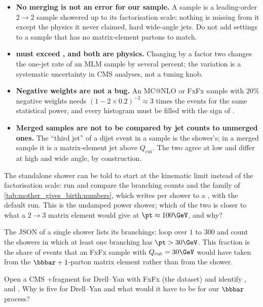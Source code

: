 \begin{pitfalls}
\begin{itemize}[nosep]
  \item \textbf{No merging is not an error for our sample.} A \PYTHIA
     sample is a leading-order $2\to2$ sample showered up to
    its factorisation scale; nothing is missing from it except the physics
    it never claimed, hard wide-angle jets. Do not add 
    settings to a sample that has no matrix-element partons to match.
  \item \textbf{ must exceed , and both are physics.}
    Changing  by a factor two changes the one-jet rate of an MLM
    sample by several percent; the variation is a systematic uncertainty
    in CMS analyses, not a tuning knob.
  \item \textbf{Negative weights are not a bug.} An MC@NLO or FxFx sample
    with $20\%$ negative weights needs $(1-2\times0.2)^{-2}\approx3$ times
    the events for the same statistical power, and every histogram must be
    filled with the sign of .
  \item \textbf{Merged samples are not to be compared by jet counts to
    unmerged ones.} The ``third jet'' of a dijet event in a \PYTHIA
     sample is the shower's; in a merged sample it is a
    matrix-element jet above $Q_{\mathrm{cut}}$. The two agree at low \pt
    and differ at high \pt and wide angle, by construction.
\end{itemize}
\end{pitfalls}

\begin{exercises}
\item The standalone shower can be told to start at the kinematic limit
  instead of the factorisation scale: run
   and
  compare the branching counts and the family \pt of
  \cref{tab:mother_gives_birth:numbers}, which  writes per
  shower to a , with the default run. This
  is the undamped power shower; which of the two is closer to what a
  $2\to3$ matrix element would give at $\pt\approx100\GeV$, and why?
\item The  JSON of a single shower lists its branchings:
  loop over  $1$ to $300$ and count the showers in
  which at least one branching has $\pt>30\GeV$. This fraction is the share
  of events that an FxFx sample with $Q_{\mathrm{cut}}=30\GeV$ would have
  taken from the $\bbbar+1$-parton matrix element rather than from the
  shower.
\item Open a CMS \MG+\PYTHIA fragment for Drell--Yan with FxFx (the
   dataset) and
  identify ,  and
  . Why is  five for Drell--Yan and
  what would it have to be for our $\bbbar$ process?
\end{exercises}

